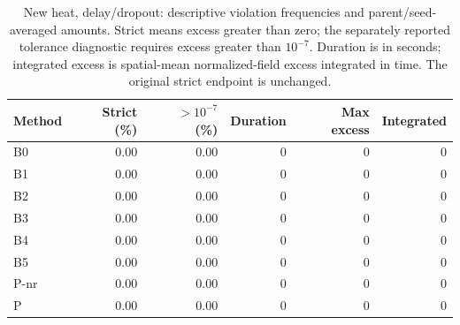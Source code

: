 \begin{table}[ht]
\centering\small
\caption{New heat, delay/dropout: descriptive violation frequencies and parent/seed-averaged amounts. Strict means excess greater than zero; the separately reported tolerance diagnostic requires excess greater than $10^{-7}$. Duration is in seconds; integrated excess is spatial-mean normalized-field excess integrated in time. The original strict endpoint is unchanged.}\label{tab:new_heat_constraints_locked_delay_dropout}
\begin{tabular}{@{}lrrrrr@{}}\toprule
Method & Strict (\%) & $>10^{-7}$ (\%) & Duration & Max excess & Integrated\\\midrule
B0 & 0.00 & 0.00 & 0 & 0 & 0\\
B1 & 0.00 & 0.00 & 0 & 0 & 0\\
B2 & 0.00 & 0.00 & 0 & 0 & 0\\
B3 & 0.00 & 0.00 & 0 & 0 & 0\\
B4 & 0.00 & 0.00 & 0 & 0 & 0\\
B5 & 0.00 & 0.00 & 0 & 0 & 0\\
P-nr & 0.00 & 0.00 & 0 & 0 & 0\\
P & 0.00 & 0.00 & 0 & 0 & 0\\
\bottomrule\end{tabular}
\end{table}
